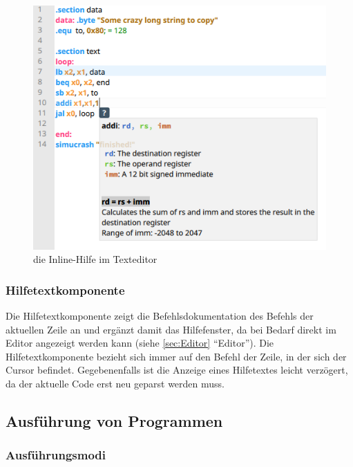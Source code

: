 \begin{figure}[ht]
	\centering
  \includegraphics[scale=0.7]{Images/Editor_help}
	\caption{die Inline-Hilfe im Texteditor}
	\label{Editor_Help}
\end{figure}




\subsubsection{Hilfetextkomponente}
\label{help-component}

Die Hilfetextkomponente zeigt die Befehlsdokumentation des Befehls der aktuellen
Zeile an und ergänzt damit das Hilfefenster, da bei Bedarf direkt im Editor
angezeigt werden kann (siehe \ref{sec:Editor} ``Editor''). Die
Hilfetextkomponente bezieht sich immer auf den Befehl der Zeile, in der sich der
Cursor befindet. Gegebenenfalls ist die Anzeige eines Hilfetextes leicht
verzögert, da der aktuelle Code erst neu geparst werden muss.


\subsection{Ausführung von Programmen}

\subsubsection{Ausführungsmodi}

